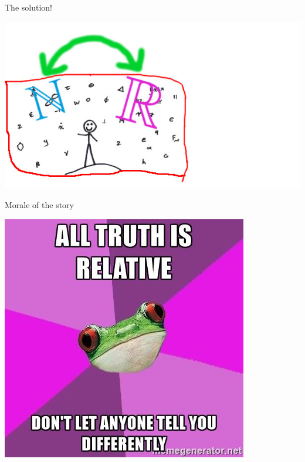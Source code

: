 \begin{frame}{The solution!}
  \begin{center}
    \includegraphics[scale=1]{gfx/maths_universe_5.jpeg}
  \end{center}
\end{frame}


\begin{frame}{Morale of the story}
  \begin{center}
    \includegraphics[scale=0.65]{gfx/truth.jpg}
  \end{center}
\end{frame}



